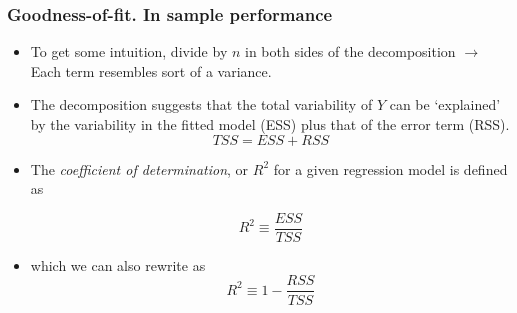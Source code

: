 \documentclass[
  shownotes,
  xcolor={svgnames},
  hyperref={colorlinks,citecolor=DarkBlue,linkcolor=andesred,urlcolor=DarkBlue}
  , aspectratio=169]{beamer}
\begin{document}
\begin{frame}
\frametitle{Goodness-of-fit. In  sample performance}

\begin{itemize}
  \item To get some intuition, divide by $n$ in both sides of the decomposition $\rightarrow$ Each term resembles sort of a variance.
  \item  The decomposition suggests that the total variability of $Y$ can be `explained' by the variability in the fitted model (ESS) plus that of the error term (RSS). 
  $$ 
  TSS = ESS + RSS 
  $$

\item The \emph{coefficient of determination}, or $R^2$ for a given regression model is defined as 

\[ R^2 \equiv \frac{ESS}{TSS}\]
\item which we can also rewrite as 
\[ R^2 \equiv 1 - \frac{RSS}{TSS}\]

\end{itemize}



\end{frame}
\end{document}
